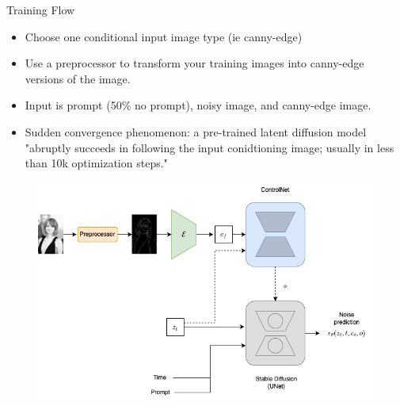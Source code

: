\documentclass[8pt]{beamer}
\begin{document}
\begin{frame}{Training Flow}
    \begin{itemize}
        \item Choose one conditional input image type (ie canny-edge)
        \item Use a preprocessor to transform your training images into canny-edge versions of the image.
        \item Input is prompt (50\% no prompt), noisy image, and canny-edge image.
        \item Sudden convergence phenomenon: a pre-trained latent diffusion model "abruptly succeeds in following the input conidtioning image; usually in less than 10k optimization steps."~\cite{zhang2023adding}
    \end{itemize}
    \begin{figure}
        \includegraphics[scale=0.23]{images/cn_training}
        \label{fig:control_net_training}
    \end{figure}
\end{frame}
\end{document}
